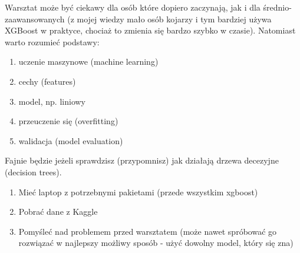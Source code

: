 \documentclass[\main/boa.tex]{subfiles}
\begin{document}
\umiejetnosci Warsztat może być ciekawy dla osób które dopiero zaczynają, jak i dla średnio-zaawansowanych (z mojej wiedzy mało osób kojarzy i tym bardziej używa XGBoost w praktyce, chociaż to zmienia się bardzo szybko w czasie).
Natomiast warto rozumieć podstawy:
\begin{enumerate}
	\item uczenie maszynowe (machine learning)
	\item cechy (features)
	\item model, np. liniowy
	\item przeuczenie się (overfitting)
	\item walidacja (model evaluation)
\end{enumerate}
Fajnie będzie jeżeli sprawdzisz (przypomnisz) jak działają drzewa decezyjne (decision trees).

\wymagania 
\begin{enumerate}
\item Mieć laptop z potrzebnymi pakietami (przede wszystkim xgboost)
\item Pobrać dane z Kaggle
\item Pomyśleć nad problemem przed warsztatem (może nawet spróbować go rozwiązać w najlepszy możliwy sposób - użyć dowolny model, który się zna)
\end{enumerate}
\end{document}
